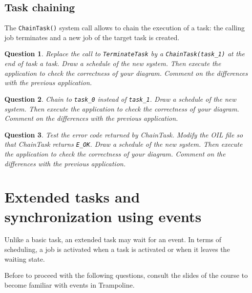 \documentclass[11pt]{report}
\newtheorem{ex}{Question}
\begin{document}
\subsection{Task chaining}

The \texttt{ChainTask()} system call allows to chain the execution of a task: the calling job terminates and a new job of the target task is created.

\begin{ex}
Replace the call to \texttt{TerminateTask} by a \texttt{ChainTask(task_1)} at the end of task a task.
Draw a schedule of the new system.
Then execute the application to check the correctness of your diagram.
Comment on the differences with the previous application.
\end{ex}

\begin{ex}
Chain to \texttt{task_0} instead of \texttt{task_1}.
Draw a schedule of the new system.
Then execute the application to check the correctness of your diagram.
Comment on the differences with the previous application.
\end{ex}

\begin{ex}
Test the error code returned by ChainTask.
Modify the OIL file so that ChainTask returns \texttt{E\_OK}.
Draw a schedule of the new system.
Then execute the application to check the correctness of your diagram.
Comment on the differences with the previous application.
\end{ex}

\section{Extended tasks and synchronization using events}

Unlike a basic task, an extended task may wait for an event.
In terms of scheduling, a job is activated when a task is activated or when it leaves the waiting state.

Before to proceed with the following questions, consult the slides of the course to become familiar with events in Trampoline.

\end{document}
